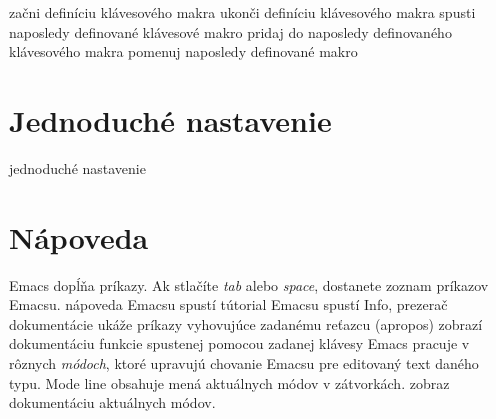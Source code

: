  začni definíciu klávesového makra
 ukonči definíciu klávesového makra
 spusti naposledy definované klávesové makro
 pridaj do naposledy definovaného klávesového makra
 pomenuj naposledy definované makro

\section{Jednoduché nastavenie}

 jednoduché nastavenie

\section{Nápoveda}

Emacs dopĺňa príkazy. Ak stlačíte  {\it tab\/} alebo {\it
space\/}, dostanete zoznam príkazov Emacsu.
\askip
{} nápoveda Emacsu
 spustí tútorial Emacsu
 spustí Info, prezerač dokumentácie
 ukáže príkazy vyhovujúce zadanému reťazcu (apropos)
 zobrazí dokumentáciu funkcie spustenej pomocou zadanej klávesy
\askip
Emacs pracuje v rôznych {\it módoch}, ktoré upravujú chovanie
Emacsu pre editovaný text daného typu. Mode line obsahuje mená aktuálnych
módov v zátvorkách.
\askip
{} zobraz dokumentáciu aktuálnych módov.

\copyrightnotice

\bye

